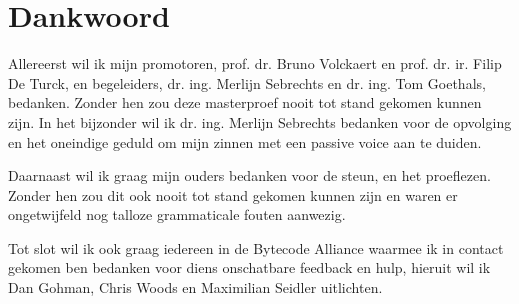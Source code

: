 \chapter*{Dankwoord}

Allereerst wil ik mijn promotoren, prof. dr. Bruno Volckaert en prof. dr. ir. Filip De Turck, en begeleiders, dr. ing. Merlijn Sebrechts en dr. ing. Tom Goethals, bedanken. Zonder hen zou deze masterproef nooit tot stand gekomen kunnen zijn. In het bijzonder wil ik dr. ing. Merlijn Sebrechts bedanken voor de opvolging en het oneindige geduld om mijn zinnen met een passive voice aan te duiden. 

Daarnaast wil ik graag mijn ouders bedanken voor de steun, en het proeflezen. Zonder hen zou dit ook nooit tot stand gekomen kunnen zijn en waren er ongetwijfeld nog talloze grammaticale fouten aanwezig. 

Tot slot wil ik ook graag iedereen in de Bytecode Alliance waarmee ik in contact gekomen ben bedanken voor diens onschatbare feedback en hulp, hieruit wil ik Dan Gohman, Chris Woods en Maximilian Seidler uitlichten.
